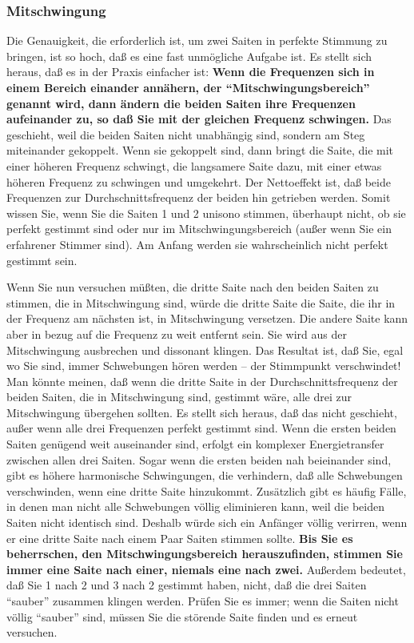 
\label{c2_5e}
\subsubsection{Mitschwingung}
\label{c2_5_mits} 

Die Genauigkeit, die erforderlich ist, um zwei Saiten in perfekte Stimmung zu bringen, ist so hoch, daß es eine fast unmögliche Aufgabe ist.
Es stellt sich heraus, daß es in der Praxis einfacher ist: \textbf{Wenn die Frequenzen sich in einem Bereich einander annähern, der \enquote{Mitschwingungsbereich} genannt wird, dann ändern die beiden Saiten ihre Frequenzen aufeinander zu, so daß Sie mit der gleichen Frequenz schwingen.}
Das geschieht, weil die beiden Saiten nicht unabhängig sind, sondern am Steg miteinander gekoppelt.
Wenn sie gekoppelt sind, dann bringt die Saite, die mit einer höheren Frequenz schwingt, die langsamere Saite dazu, mit einer etwas höheren Frequenz zu schwingen und umgekehrt.
Der Nettoeffekt ist, daß beide Frequenzen zur Durchschnittsfrequenz der beiden hin getrieben werden.
Somit wissen Sie, wenn Sie die Saiten 1 und 2 unisono stimmen, überhaupt nicht, ob sie perfekt gestimmt sind oder nur im Mitschwingungsbereich (außer wenn Sie ein erfahrener Stimmer sind).
Am Anfang werden sie wahrscheinlich nicht perfekt gestimmt sein.

Wenn Sie nun versuchen müßten, die dritte Saite nach den beiden Saiten zu stimmen, die in Mitschwingung sind, würde die dritte Saite die Saite, die ihr in der Frequenz am nächsten ist, in Mitschwingung versetzen.
Die andere Saite kann aber in bezug auf die Frequenz zu weit entfernt sein.
Sie wird aus der Mitschwingung ausbrechen und dissonant klingen.
Das Resultat ist, daß Sie, egal wo Sie sind, immer Schwebungen hören werden -- der Stimmpunkt verschwindet!
Man könnte meinen, daß wenn die dritte Saite in der Durchschnittsfrequenz der beiden Saiten, die in Mitschwingung sind, gestimmt wäre, alle drei zur Mitschwingung übergehen sollten.
Es stellt sich heraus, daß das nicht geschieht, außer wenn alle drei Frequenzen perfekt gestimmt sind.
Wenn die ersten beiden Saiten genügend weit auseinander sind, erfolgt ein komplexer Energietransfer zwischen allen drei Saiten.
Sogar wenn die ersten beiden nah beieinander sind, gibt es höhere harmonische Schwingungen, die verhindern, daß alle Schwebungen verschwinden, wenn eine dritte Saite hinzukommt.
Zusätzlich gibt es häufig Fälle, in denen man nicht alle Schwebungen völlig eliminieren kann, weil die beiden Saiten nicht identisch sind.
Deshalb würde sich ein Anfänger völlig verirren, wenn er eine dritte Saite nach einem Paar Saiten stimmen sollte.
\textbf{Bis Sie es beherrschen, den Mitschwingungsbereich herauszufinden, stimmen Sie immer eine Saite nach einer, niemals eine nach zwei.}
Außerdem bedeutet, daß Sie 1 nach 2 und 3 nach 2 gestimmt haben, nicht, daß die drei Saiten \enquote{sauber} zusammen klingen werden.
Prüfen Sie es immer; wenn die Saiten nicht völlig \enquote{sauber} sind, müssen Sie die störende Saite finden und es erneut versuchen.

